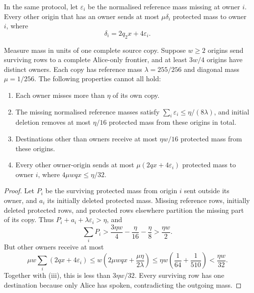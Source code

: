 \documentclass[11pt]{article} \usepackage[utf8]{inputenc}
\theoremstyle{plain} \newtheorem{theorem}{Theorem}[section]
\theoremstyle{definition} \newaliascnt{definition}{theorem}
\begin{document}
\begin{lemma}\label{res:foreign}
In the same protocol, let $\varepsilon_i$ be the normalised reference
mass missing at owner $i$. Every other origin that has an owner sends at
most $\mu\delta_i$ protected mass to owner $i$, where
\[
 \delta_i=2q_2x+4\varepsilon_i.
\]
\end{lemma}

\begin{lemma}\label{lem:protected-accounting}
Measure mass in units of one complete source copy. Suppose $w\ge2$
origins send surviving rows to a complete Alice-only frontier, and at
least $3w/4$ origins have distinct owners. Each copy has reference mass
$\lambda=255/256$ and diagonal mass $\mu=1/256$.
The following properties cannot all hold:
\begin{enumerate}
\item[(i)] Each owner misses more than $\eta$ of its own copy.
\item[(ii)] The missing normalised reference masses satisfy
$\sum_i\varepsilon_i\le\eta/(8\lambda)$, and initial deletion removes
at most $\eta/16$ protected mass from these origins in total.
\item[(iii)] Destinations other than owners receive at most $\eta w/16$
protected mass from these origins.
\item[(iv)] Every other owner-origin sends at most
$\mu(2qx+4\varepsilon_i)$ protected mass to owner $i$, where
$4\mu wqx\le\eta/32$.
\end{enumerate}
\end{lemma}
\begin{proof}
Let $P_i$ be the surviving protected mass from origin $i$ sent outside
its owner, and $a_i$ its initially deleted protected mass. Missing
reference rows, initially deleted protected rows, and protected rows
elsewhere partition the missing part of its copy. Thus
$P_i+a_i+\lambda\varepsilon_i>\eta$, and
\[
 \sum_iP_i>\frac{3\eta w}{4}-\frac{\eta}{16}-\frac{\eta}{8}
 >\frac{\eta w}{2}.
\]
But other owners receive at most
\[
 \mu w\sum_i(2qx+4\varepsilon_i)
 \le w\left(2\mu wqx+\frac{\mu\eta}{2\lambda}\right)
 \le\eta w\left(\frac1{64}+\frac1{510}\right)<\frac{\eta w}{32}.
\]
Together with (iii), this is less than $3\eta w/32$. Every surviving
row has one destination because only Alice has spoken, contradicting
the outgoing mass.
\end{proof}
\end{document}
